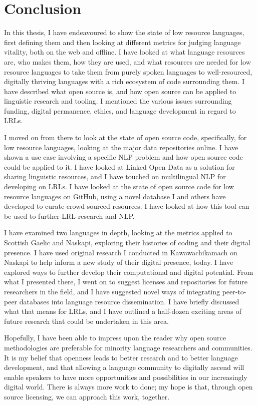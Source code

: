 \section{Conclusion}
\label{sec:conclusion}

In this thesis, I have endeavoured to show the state of low resource languages, first defining them and then looking at different metrics for judging language vitality, both on the web and offline. I have looked at what language resources are, who makes them, how they are used, and what resources are needed for low resource languages to take them from purely spoken languages to well-resourced, digitally thriving languages with a rich ecosystem of code surrounding them. I have described what open source is, and how open source can be applied to linguistic research and tooling. I mentioned the various issues surrounding funding, digital permanence, ethics, and language development in regard to LRLs.

I moved on from there to look at the state of open source code, specifically, for low resource languages, looking at the major data repositories online. I have shown a use case involving a specific NLP problem and how open source code could be applied to it. I have looked at Linked Open Data as a solution for sharing linguistic resources, and I have touched on multilingual NLP for developing on LRLs. I have looked at the state of open source code for low resource languages on GitHub, using a novel database I and others have developed to curate crowd-sourced resources. I have looked at how this tool can be used to further LRL research and NLP. 

I have examined two languages in depth, looking at the metrics applied to Scottish Gaelic and Naskapi, exploring their histories of coding and their digital presence. I have used original research I conducted in Kawawachikamach on Naskapi to help inform a new study of their digital presence, today. I have explored ways to further develop their computational and digital potential. From what I presented there, I went on to suggest licenses and repositories for future researchers in the field, and I have suggested novel ways of integrating peer-to-peer databases into language resource dissemination. I have briefly discussed what that means for LRLs, and I have outlined a half-dozen exciting areas of future research that could be undertaken in this area.

Hopefully, I have been able to impress upon the reader why open source methodologies are preferable for minority language researchers and communities. It is my belief that openness leads to better research and to better language development, and that allowing a language community to digitally ascend will enable speakers to have more opportunities and possibilities in our increasingly digital world. There is always more work to done; my hope is that, through open source licensing, we can approach this work, together.